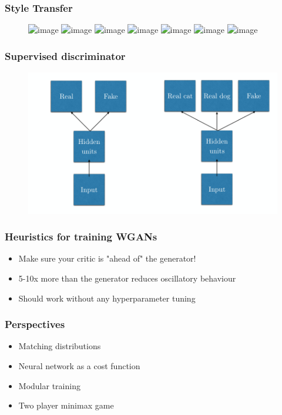 \documentclass{Bredelebeamer}
\begin{document}
\begin{frame}
	\frametitle{Style Transfer}
	\begin{figure}[h!]
	\centering
	\includegraphics<1>[width=\textwidth]{cycle_gan/cg_1.png}
	\includegraphics<2>[width=\textwidth]{cycle_gan/cg_2.png}
	\includegraphics<3>[width=\textwidth]{cycle_gan/cg_3.png}
	\includegraphics<4>[width=\textwidth]{cycle_gan/cg_4.png}
	\includegraphics<5>[width=\textwidth]{cycle_gan/cg_5.png}
	\includegraphics<6>[width=\textwidth]{cycle_gan/cg_6.png}
	\includegraphics<7->[width=\textwidth]{cycle_gan/cyclegan_style_transfer.jpg}
	\end{figure}
	\pause[8]
	\href{https://www.youtube.com/watch?v=9reHvktowLY}{}
	\href{https://twitter.com/quasimondo/status/880005499084734465}{}
\end{frame}
\begin{frame}
	\frametitle{Supervised discriminator}
	\begin{figure}[h!]
	\centering
	\includegraphics[width=\textwidth]{supervised_discriminator.png}
	\end{figure}
\end{frame}
\begin{frame}
\frametitle{Heuristics for training WGANs}
\begin{itemize}
	\item Make sure your critic is "ahead of" the generator!
	\item 5-10x more than the generator reduces oscillatory behaviour
	\item Should work without any hyperparameter tuning
\end{itemize}
\end{frame}
\begin{frame}
\frametitle{Perspectives}
\begin{itemize}
	\item Matching distributions
	\item Neural network as a cost function
	\item Modular training
	\item Two player minimax game
\end{itemize}
\end{frame}
\end{document}
